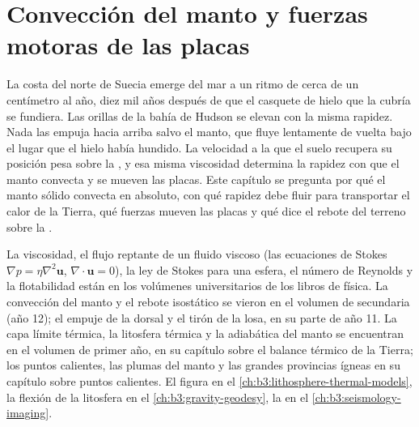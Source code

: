 \chapter{Convección del manto y fuerzas motoras de las placas}\label{ch:b3:mantle-convection}

La costa del norte de Suecia emerge del mar a un ritmo de cerca de un centímetro al
año, diez mil años después de que el casquete de hielo que la cubría se fundiera.
Las orillas de la bahía de Hudson se elevan con la misma rapidez. Nada las empuja hacia arriba salvo el manto,
que fluye lentamente de vuelta bajo el lugar que el hielo había hundido. La velocidad
a la que el suelo recupera su posición pesa sobre la , y esa misma
viscosidad determina la rapidez con que el manto convecta y se mueven las placas. Este capítulo
se pregunta por qué el manto sólido convecta en absoluto, con qué rapidez debe fluir para transportar
el calor de la Tierra, qué fuerzas mueven las placas y qué dice el rebote del terreno
sobre la .

\begin{recall}
La viscosidad, el flujo reptante de un fluido viscoso (las ecuaciones de Stokes
$\nabla p = \eta\nabla^2\mathbf u$, $\nabla\cdot\mathbf u = 0$), la ley de Stokes
para una esfera, el número de Reynolds y la flotabilidad están en los volúmenes
universitarios de los libros de física. La convección del manto y el rebote isostático se vieron en el
volumen de secundaria (año 12); el empuje de la dorsal y el tirón de la losa, en su parte de año 11.
La capa límite térmica, la litosfera térmica y la adiabática del manto se encuentran
en el volumen de primer año, en su capítulo sobre el balance térmico de la Tierra; los puntos calientes,
las plumas del manto y las grandes provincias ígneas en su capítulo sobre puntos calientes.
El  figura en el \cref{ch:b3:lithosphere-thermal-models},
la flexión de la litosfera en el \cref{ch:b3:gravity-geodesy}, la 
en el \cref{ch:b3:seismology-imaging}.
\end{recall}

